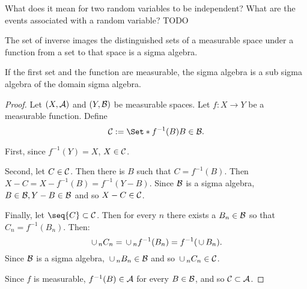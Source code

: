 
\sbasic


























\sstart
{}


What does it mean for
two random variables to
be independent?
What are the events associated
with a random variable?
TODO


\begin{prop}

The set of inverse images
the distinguished sets
of a measurable space under
a function from a set to
that space is a sigma algebra.

If the first set and the
function are measurable,
the sigma algebra is a sub
sigma algebra of the domain
sigma algebra.

\begin{proof}
  Let $(X, \mathcal{A})$
  and $(Y, \mathcal{B})$ be
  measurable spaces.
  Let $f: X \to Y$
  be a measurable function.
  Define
  \[
    \SC := \Set*{f^{-1}(B)}{B \in \SB}.
  \]

  First,
  since $f^{-1}(Y) = X$,
  $X \in \mathcal{C}$.

  Second, let $C \in \mathcal{C}$.
  Then there is $B$ such that
  $C = f^{-1}(B)$.
  Then $X - C = X - f^{-1}(B) = f^{-1}(Y - B)$.
  Since $\mathcal{B}$ is a sigma algebra,
  $B \in \mathcal{B}, Y - B \in \mathcal{B}$ and so
  $X - C \in \mathcal{C}$.

  Finally, let $\seq{C} \subset \SC$.
  Then for every $n$ there exists
  a $B_n \in \mathcal{B}$ so that $C_n = f^{-1}(B_n)$.
  Then:
  \[
    \,\cup\,_{n} C_n = \,\cup\,_n f^{-1}(B_n) = f^{-1}(\,\cup\, B_n).
  \]
  Since $\mathcal{B}$ is a sigma algebra,
  $\,\cup\,_n B_n \in \mathcal{B}$ and so $\,\cup\,_{n} C_n \in \mathcal{C}$.

  Since $f$ is measurable,
  $f^{-1}(B) \in \mathcal{A}$ for
  every $B \in \mathcal{B}$, and so $\mathcal{C} \subset \mathcal{A}$.
\end{proof}
\end{prop}


